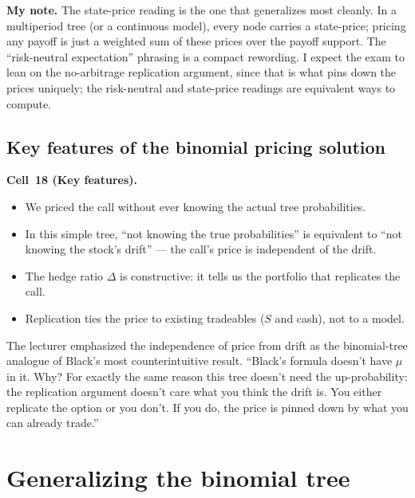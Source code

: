 \begin{checkpoint}
\textbf{My note.} The state-price reading is the one that
generalizes most cleanly. In a multiperiod tree (or a continuous
model), every node carries a state-price; pricing any payoff is just
a weighted sum of these prices over the payoff support. The
``risk-neutral expectation'' phrasing is a compact rewording. I
expect the exam to lean on the no-arbitrage replication argument,
since that is what pins down the prices uniquely; the
risk-neutral and state-price readings are equivalent ways to
compute.
\end{checkpoint}

\subsection{Key features of the binomial pricing solution}\label{L8-sec:keyfeatures}

\begin{keyblock}
\textbf{Cell~18 (Key features).}
\begin{itemize}
  \item We priced the call without ever knowing the actual tree
        probabilities.
  \item In this simple tree, ``not knowing the true probabilities''
        is equivalent to ``not knowing the stock's drift'' --- the
        call's price is independent of the drift.
  \item The hedge ratio $\Delta$ is constructive: it tells us the
        portfolio that replicates the call.
  \item Replication ties the price to existing tradeables ($S$ and
        cash), not to a model.
\end{itemize}
\end{keyblock}

The lecturer emphasized the independence of price from drift as
the binomial-tree analogue of Black's most counterintuitive result.
``Black's formula doesn't have $\mu$ in it. Why? For exactly the
same reason this tree doesn't need the up-probability: the
replication argument doesn't care what you think the drift is. You
either replicate the option or you don't. If you do, the price is
pinned down by what you can already trade.''

\section{Generalizing the binomial tree}\label{L8-sec:general}

